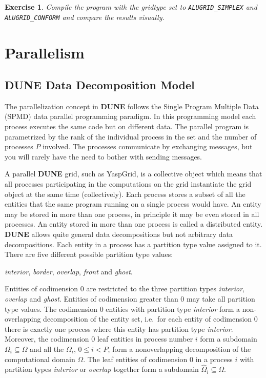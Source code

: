 \documentclass[11pt,a4paper,headinclude,footinclude,DIV16,normalheadings]{scrreprt}
\newcommand{\Dune}{{\sf\bfseries DUNE}\xspace}
\newtheorem{exc}{Exercise}[chapter]
\begin{document}
\begin{exc}
  Compile the program with the gridtype set to \lstinline!ALUGRID_SIMPLEX!
  and \lstinline!ALUGRID_CONFORM! and compare the results visually.  
\end{exc}

\chapter{Parallelism}

\section{\texorpdfstring{\Dune{}}{DUNE} Data Decomposition Model}

The parallelization concept in \Dune{} follows the Single Program
Multiple Data (SPMD) data parallel programming paradigm. In this
programming model each process executes the same code but on different
data. The parallel program is parametrized
by the rank of the individual process in the set and the number of
processes $P$
involved. The processes communicate by exchanging messages, but you
will rarely have the need to bother with sending messages.

A parallel \Dune{} grid, such as YaspGrid, is a collective object which
means that all processes participating in the computations on the grid
instantiate the grid object at the same time (collectively). Each
process stores a subset of all the entities that the same program running on a
single process would have. An entity may be stored in more
than one process, in principle it may be even stored in all
processes. An entity
stored in more than one process is called a distributed entity. \Dune{}
allows quite general data decompositions but not arbitrary data
decompositions. Each entity in a process has a partition type
value assigned to it. There are five different possible partition type
values:
\begin{center}
\textit{interior}, \textit{border}, \textit{overlap},
  \textit{front} and \textit{ghost}.
\end{center}

Entities of codimension 0 are restricted to the three partition types
\textit{interior}, \textit{overlap} and \textit{ghost}. Entities of
codimension greater than 0 may take all partition type values. 
The codimension 0 entities with partition type \textit{interior} form a
non-overlapping decomposition of the entity set, i.e.~for each
entity of codimension 0 there is exactly one process where this entity
has partition type \textit{interior}.
Moreover, the codimension 0 leaf entities in process number $i$ form a
subdomain $\Omega_i\subseteq\Omega$ and all the $\Omega_i$, $0\leq i <
P$, form a nonoverlapping decomposition of the computational domain
$\Omega$. The leaf entities of codimension 0 in a process $i$ with
partition types \textit{interior} or \textit{overlap} together form a
subdomain $\hat{\Omega}_i\subseteq\Omega$.
\end{document}
